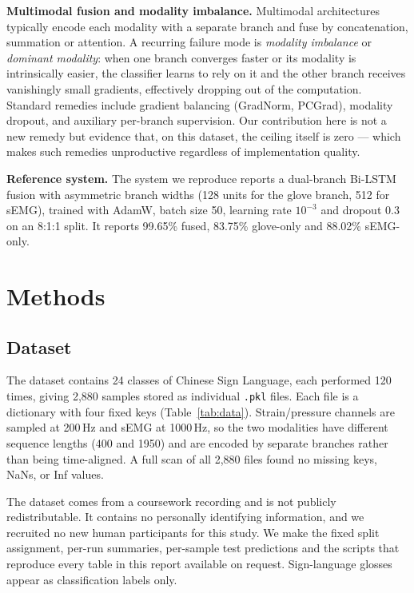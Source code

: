 \documentclass[11pt,a4paper]{article}
\begin{document}
\textbf{Multimodal fusion and modality imbalance.} Multimodal architectures typically encode each modality with a separate branch and fuse by concatenation, summation or attention. A recurring failure mode is \emph{modality imbalance} or \emph{dominant modality}: when one branch converges faster or its modality is intrinsically easier, the classifier learns to rely on it and the other branch receives vanishingly small gradients, effectively dropping out of the computation. Standard remedies include gradient balancing (GradNorm, PCGrad), modality dropout, and auxiliary per-branch supervision. Our contribution here is not a new remedy but evidence that, on this dataset, the ceiling itself is zero --- which makes such remedies unproductive regardless of implementation quality.

\textbf{Reference system.} The system we reproduce reports a dual-branch Bi-LSTM fusion with asymmetric branch widths (128 units for the glove branch, 512 for sEMG), trained with AdamW, batch size 50, learning rate $10^{-3}$ and dropout 0.3 on an 8:1:1 split. It reports 99.65\% fused, 83.75\% glove-only and 88.02\% sEMG-only.

\section{Methods}
\label{sec:methods}

\subsection{Dataset}

The dataset contains 24 classes of Chinese Sign Language, each performed 120 times, giving 2{,}880 samples stored as individual \texttt{.pkl} files. Each file is a dictionary with four fixed keys (Table~\ref{tab:data}). Strain/pressure channels are sampled at 200\,Hz and sEMG at 1000\,Hz, so the two modalities have different sequence lengths (400 and 1950) and are encoded by separate branches rather than being time-aligned. A full scan of all 2{,}880 files found no missing keys, NaNs, or Inf values.

The dataset comes from a coursework recording and is not publicly redistributable. It contains no personally identifying information, and we recruited no new human participants for this study. We make the fixed split assignment, per-run summaries, per-sample test predictions and the scripts that reproduce every table in this report available on request. Sign-language glosses appear as classification labels only.
\end{document}
